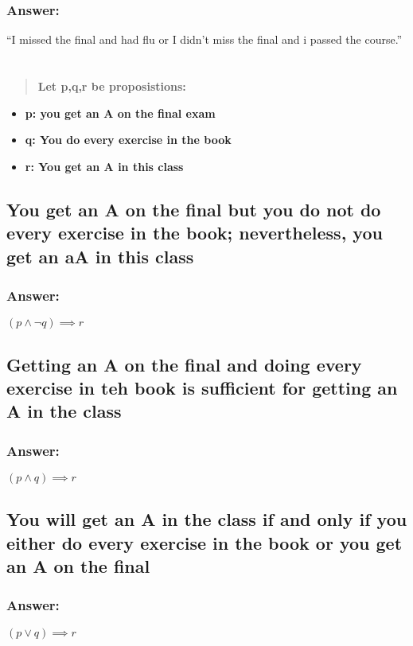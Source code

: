 \documentclass[titlepage]{article}\usepackage[]{graphicx}\usepackage[]{color}
\begin{document}
\subsubsection{Answer:}
``I missed the final and had flu or I didn't miss the final and i passed the
course.''


\section{ }
\begin{quote}
  \textbf{Let p,q,r be proposistions:}
\end{quote}

\begin{itemize}
  \item \textbf{p: you get an A on the final exam}
  \item \textbf{q: You do every exercise in the book}
  \item \textbf{r: You get an A in this class}
\end{itemize}
\subsection{You get an A on the final but you do not do every exercise in the
book; nevertheless, you get an aA in this class}
\subsubsection{Answer:}
\( (p \land \lnot q) \implies r \)

\subsection{Getting an A on the final and doing every exercise in teh book is
sufficient for getting an A in the class}
\subsubsection{Answer:}
\( ( p \land q) \implies r \)

\subsection{You will get an A in the class if and only if you either do every
exercise in the book or you get an A on the final}
\subsubsection{Answer:}
$ ( p \lor q) \implies r $
\end{document}
